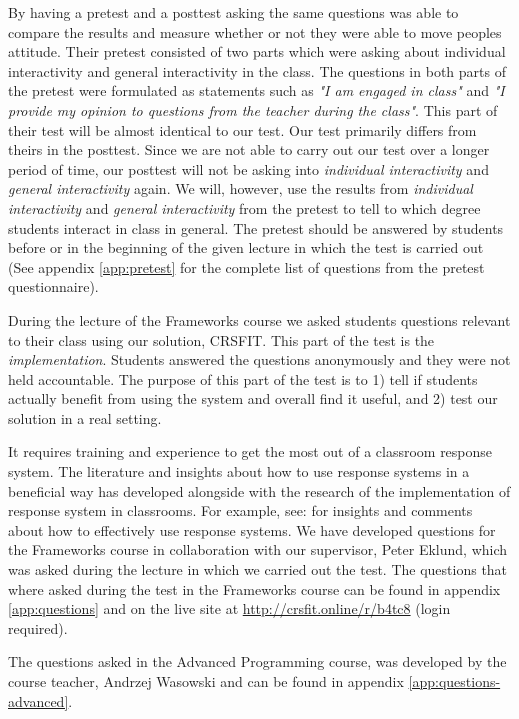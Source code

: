 By having a pretest and a posttest asking the same questions  was able to compare the results and measure whether or not they were able to move peoples attitude. Their pretest consisted of two parts which were asking about individual interactivity and general interactivity in the class. The questions in both parts of the pretest were formulated as statements such as \emph{"I am engaged in class"} and \emph{"I provide my opinion to questions from the teacher during the class"}. This part of their test will be almost identical to our test. Our test primarily differs from theirs in the posttest. Since we are not able to carry out our test over a longer period of time, our posttest will not be asking into \emph{individual interactivity} and \emph{general interactivity} again. We will, however, use the results from \emph{individual interactivity} and \emph{general interactivity} from the pretest to tell to which degree students interact in class in general. The pretest should be answered by students before or in the beginning of the given lecture in which the test is carried out (See appendix \ref{app:pretest} for the complete list of questions from the pretest questionnaire).

During the lecture of the Frameworks course we asked students questions relevant to their class using our solution, CRSFIT. This part of the test is the \emph{implementation}. Students answered the questions anonymously and they were not held accountable. The purpose of this part of the test is to 1) tell if students actually benefit from using the system and overall find it useful, and 2) test our solution in a real setting.

It requires training and experience to get the most out of a classroom response system. The literature and insights about how to use response systems in a beneficial way has developed alongside with the research of the implementation of response system in classrooms. For example, see: \cite{lantz2014effectiveness,draper2004increasing,lin2011implementing} for insights and comments about how to effectively use response systems. 
We have developed questions for the Frameworks course in collaboration with our supervisor, Peter Eklund, which was asked during the lecture in which we carried out the test.
The questions that where asked during the test in the Frameworks course can be found in appendix \ref{app:questions} and on the live site at \url{http://crsfit.online/r/b4tc8} (login required). 

The questions asked in the Advanced Programming course, was developed by the course teacher, Andrzej Wasowski and can be found in appendix \ref{app:questions-advanced}.


